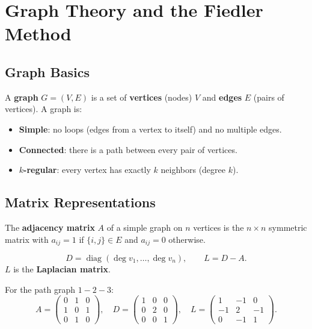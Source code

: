 \chapter{Graph Theory and the Fiedler Method}

\section{Graph Basics}

\begin{definition}
A \textbf{graph} $G=(V,E)$ is a set of \textbf{vertices} (nodes) $V$ and \textbf{edges} $E$ (pairs of vertices). A graph is:
\begin{itemize}
  \item \textbf{Simple}: no loops (edges from a vertex to itself) and no multiple edges.
  \item \textbf{Connected}: there is a path between every pair of vertices.
  \item \textbf{$k$-regular}: every vertex has exactly $k$ neighbors (degree $k$).
\end{itemize}
\end{definition}

\section{Matrix Representations}

\begin{definition}
The \textbf{adjacency matrix} $A$ of a simple graph on $n$ vertices is the $n\times n$ symmetric matrix with $a_{ij}=1$ if $\{i,j\}\in E$ and $a_{ij}=0$ otherwise.
\end{definition}

\begin{definition}
\[
  D = \operatorname{diag}(\deg v_1,\ldots,\deg v_n), \qquad L = D - A.
\]
$L$ is the \textbf{Laplacian matrix}.
\end{definition}

\begin{example}
For the path graph $1-2-3$:
\[
A=\begin{pmatrix}0&1&0\\1&0&1\\0&1&0\end{pmatrix}, \quad
D=\begin{pmatrix}1&0&0\\0&2&0\\0&0&1\end{pmatrix}, \quad
L=\begin{pmatrix}1&-1&0\\-1&2&-1\\0&-1&1\end{pmatrix}.
\]
\end{example}

